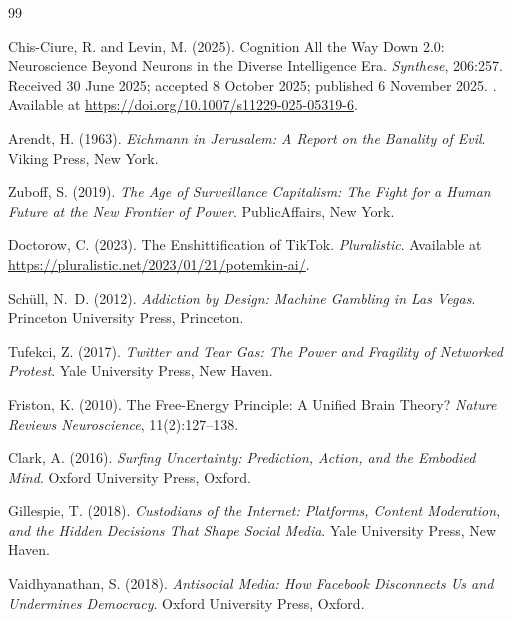 \documentclass[12pt]{article}
\begin{document}
\newpage
\begin{thebibliography}{99}

Chis-Ciure, R. and Levin, M. (2025).
\newblock Cognition All the Way Down 2.0: Neuroscience Beyond Neurons in the Diverse Intelligence Era.
\newblock \emph{Synthese}, 206:257.
\newblock Received 30 June 2025; accepted 8 October 2025; published 6 November 2025.
\newblock {}.
\newblock Available at \url{https://doi.org/10.1007/s11229-025-05319-6}.

Arendt, H. (1963).
\newblock \emph{Eichmann in Jerusalem: A Report on the Banality of Evil}.
\newblock Viking Press, New York.

Zuboff, S. (2019).
\newblock \emph{The Age of Surveillance Capitalism: The Fight for a Human Future at the New Frontier of Power}.
\newblock PublicAffairs, New York.

Doctorow, C. (2023).
\newblock The Enshittification of TikTok.
\newblock \emph{Pluralistic}.
\newblock Available at \url{https://pluralistic.net/2023/01/21/potemkin-ai/}.

Sch{\"u}ll, N.~D. (2012).
\newblock \emph{Addiction by Design: Machine Gambling in Las Vegas}.
\newblock Princeton University Press, Princeton.

Tufekci, Z. (2017).
\newblock \emph{Twitter and Tear Gas: The Power and Fragility of Networked Protest}.
\newblock Yale University Press, New Haven.

Friston, K. (2010).
\newblock The Free-Energy Principle: A Unified Brain Theory?
\newblock \emph{Nature Reviews Neuroscience}, 11(2):127--138.

Clark, A. (2016).
\newblock \emph{Surfing Uncertainty: Prediction, Action, and the Embodied Mind}.
\newblock Oxford University Press, Oxford.

Gillespie, T. (2018).
\newblock \emph{Custodians of the Internet: Platforms, Content Moderation, and the Hidden Decisions That Shape Social Media}.
\newblock Yale University Press, New Haven.

Vaidhyanathan, S. (2018).
\newblock \emph{Antisocial Media: How Facebook Disconnects Us and Undermines Democracy}.
\newblock Oxford University Press, Oxford.


\end{thebibliography}
\end{document}
